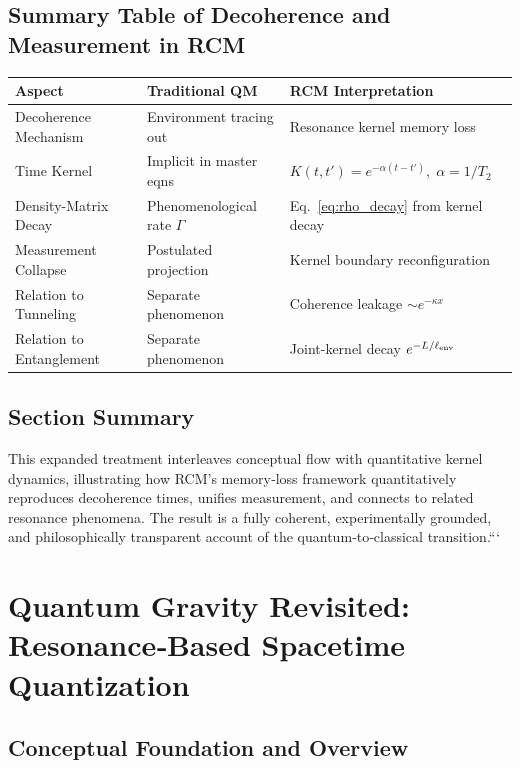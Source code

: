 \subsection{Summary Table of Decoherence and Measurement in RCM}

\begin{center}
\begin{tabular}{|l|l|l|}
\hline
\textbf{Aspect}             & \textbf{Traditional QM}           & \textbf{RCM Interpretation}                 \\ \hline
Decoherence Mechanism       & Environment tracing out           & Resonance kernel memory loss                \\ \hline
Time Kernel                 & Implicit in master eqns           & $K(t,t')=e^{-\alpha(t-t')},\;\alpha=1/T_2$  \\ \hline
Density-Matrix Decay        & Phenomenological rate $\Gamma$    & Eq.~\eqref{eq:rho_decay} from kernel decay  \\ \hline
Measurement Collapse        & Postulated projection             & Kernel boundary reconfiguration             \\ \hline
Relation to Tunneling       & Separate phenomenon               & Coherence leakage $\sim e^{-\kappa x}$      \\ \hline
Relation to Entanglement    & Separate phenomenon               & Joint-kernel decay $e^{-L/\ell_{\rm env}}$  \\ \hline
\end{tabular}
\end{center}

\subsection{Section Summary}

This expanded treatment interleaves conceptual flow with quantitative kernel dynamics, illustrating how RCM’s memory‐loss framework quantitatively reproduces decoherence times, unifies measurement, and connects to related resonance phenomena. The result is a fully coherent, experimentally grounded, and philosophically transparent account of the quantum‐to‐classical transition.```

\section{Quantum Gravity Revisited: Resonance‐Based Spacetime Quantization}

\subsection{Conceptual Foundation and Overview}

